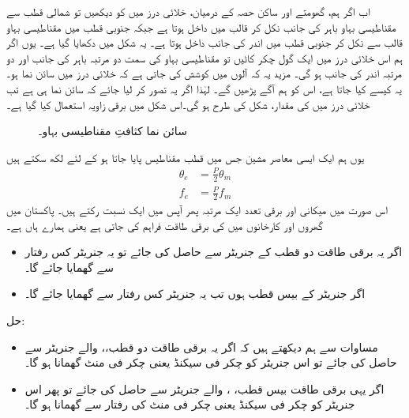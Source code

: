 اب اگر ہم، گھومتے اور ساکن حصہ کے درمیان، خلائی درز میں  کو دیکھیں تو شمالی قطب سے مقناطیسی بہاو باہر کی جانب  نکل کر  قالب میں داخل ہوتا ہے جبکہ جنوبی قطب میں مقناطیسی بہاو قالب سے نکل کر جنوبی قطب میں اندر کی جانب داخل ہوتا ہے۔ یہ شکل   میں دکھایا گیا ہے۔ یوں اگر ہم اس خلائی درز میں ایک گول چکر کاٹیں تو مقناطیسی بہاو کی سمت  دو مرتبہ باہر کی جانب اور دو مرتبہ اندر کی جانب ہو گی۔ مزید یہ کہ   آلوں میں کوشش کی جاتی ہے کہ خلائی درز میں  سائن نما ہو۔ یہ کیسے کیا جاتا ہے، اس کو ہم آگے پڑھیں گے۔  لہٰذا اگر یہ تصور کر لیا جائے کہ  سائن نما ہی ہے تب  خلائی درز میں  کی مقدار، شکل   کی طرح ہو گی۔اس شکل میں برقی زاویہ  استعمال کیا گیا ہے۔ 
\begin{figure}
\centering
\caption{سائن نما کثافتِ مقناطیسی بہاو۔}
\label{شکل_گھومتے_مشین_سائن_نما_بہاو}
\end{figure}

 یوں ہم ایک ایسی معاصر مشین جس میں  قطب مقناطیس پایا جاتا ہو کے لئے لکھ سکتے ہیں
\begin{align}
\theta_e&=\frac{P}{2} \theta_m\\
f_e&=\frac{P}{2} f_m  \label{مساوات_گھومتے_مشین_برقی_میکانی_تعدد_تعلق}
\end{align}
اس صورت میں میکانی اور برقی تعدد ایک مرتبہ پھر آپس میں ایک نسبت رکتے ہیں۔ 
%
پاکستان میں گھروں اور کارخانوں میں  کی برقی طاقت فراہم کی جاتی ہے یعنی ہمارے ہاں  ہے۔
\begin{itemize}
\item
اگر یہ برقی طاقت دو قطب کے جنریٹر سے حاصل کی جائے تو یہ جنریٹر  کس رفتار سے گھمایا جائے گا۔
\item
اگر جنریٹر کے بیس قطب ہوں تب یہ جنریٹر کس رفتار سے گھمایا جائے گا۔
\end{itemize}

حل:
\begin{itemize}
\item
مساوات   سے ہم دیکھتے ہیں کہ اگر یہ برقی طاقت دو قطب،،  والے جنریٹر سے حاصل کی جائے تو اس جنریٹر کو  چکر فی سیکنڈ یعنی  چکر فی منٹ گھمانا ہو گا۔
\item
 اگر یہی برقی طاقت بیس قطب، ،  والے جنریٹر سے حاصل کی جائے تو پھر اس جنریٹر کو  چکر فی سیکنڈ یعنی  چکر فی منٹ کی رفتار سے گھمانا ہو گا۔
\end{itemize}
%

